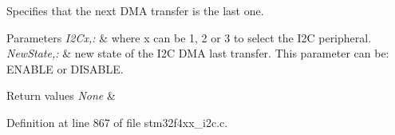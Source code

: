 Specifies that the next D\-M\-A transfer is the last one. 


\begin{DoxyParams}{Parameters}
{\em I2\-Cx,\-:} & where x can be 1, 2 or 3 to select the I2\-C peripheral. \\
\hline
{\em New\-State,\-:} & new state of the I2\-C D\-M\-A last transfer. This parameter can be\-: E\-N\-A\-B\-L\-E or D\-I\-S\-A\-B\-L\-E. \\
\hline
\end{DoxyParams}

\begin{DoxyRetVals}{Return values}
{\em None} & \\
\hline
\end{DoxyRetVals}


Definition at line 867 of file stm32f4xx\-\_\-i2c.\-c.

